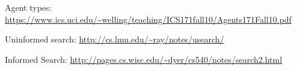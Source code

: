 \documentclass[12pt]{article}
\begin{document}
Agent types: \url{https://www.ics.uci.edu/~welling/teaching/ICS171fall10/Agents171Fall10.pdf}  

Uninformed search: \url{http://cs.lmu.edu/~ray/notes/usearch/}

Informed Search: \url{http://pages.cs.wisc.edu/~dyer/cs540/notes/search2.html}
\end{document}
